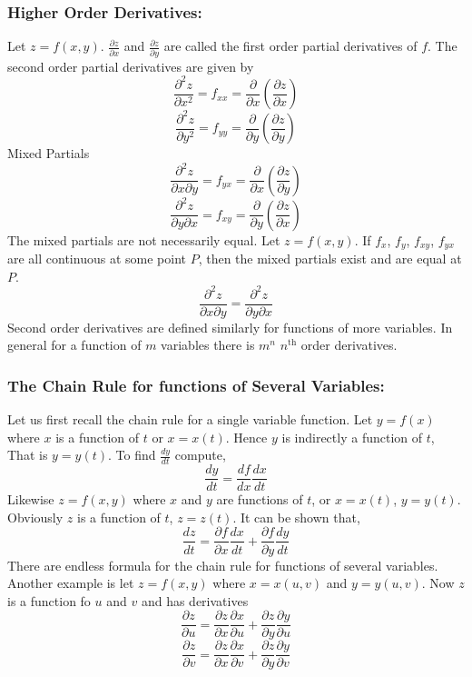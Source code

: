 \documentclass[14pt]{article}
\begin{document}
    \subsubsection{Higher Order Derivatives:}
    Let $z=f(x,y)$. $\frac{\partial z}{\partial x}$ and $\frac{\partial z}{\partial y}$ are called the first order partial derivatives of $f$. The second order partial derivatives are given by
    $$\frac{\partial^2z}{\partial x^2}=f_{xx}=\frac{\partial}{\partial x}\left(\frac{\partial z}{\partial x}\right)$$ 
    $$\frac{\partial^2z}{\partial y^2}=f_{yy}=\frac{\partial}{\partial y}\left(\frac{\partial z}{\partial y}\right)$$
    Mixed Partials
    $$\frac{\partial^2 z}{\partial x\partial y}=f_{yx}=\frac{\partial}{\partial x}\left(\frac{\partial z}{\partial y}\right)$$
    $$\frac{\partial^2 z}{\partial y\partial x}=f_{xy}=\frac{\partial}{\partial y}\left(\frac{\partial z}{\partial x}\right)$$
    The mixed partials are not necessarily equal. Let $z=f(x,y)$. If $f_x$, $f_y$, $f_{xy}$, $f_{yx}$ are all continuous at some point $P$, then the mixed partials exist and are equal at $P$.
    $$\frac{\partial^2 z}{\partial x\partial y}=\frac{\partial^2 z}{\partial y\partial x}$$
    Second order derivatives are defined similarly for functions of more variables. In general for a function of $m$ variables there is $m^n$ $n^{\mathrm{th}}$ order derivatives.
    \subsubsection{The Chain Rule for functions of Several Variables:}
    Let us first recall the chain rule for a single variable function. Let $y=f(x)$ where $x$ is a function of $t$ or $x=x(t)$. Hence $y$ is indirectly a function of $t$, That is $y=y(t)$. To find $\frac{dy}{dt}$ compute,
    $$\frac{dy}{dt}=\frac{df}{dx}\frac{dx}{dt}$$
    Likewise $z=f(x,y)$ where $x$ and $y$ are functions of $t$, or $x=x(t)$, $y=y(t)$. Obviously $z$ is a function of $t$, $z=z(t)$. It can be shown that,
    $$\frac{dz}{dt}=\frac{\partial f}{\partial x}\frac{dx}{dt}+\frac{\partial f}{\partial y}\frac{dy}{dt}$$
    There are endless formula for the chain rule for functions of several variables. Another example is let $z=f(x,y)$ where $x=x(u,v)$ and $y=y(u,v)$. Now $z$ is a function fo $u$ and $v$ and has derivatives
    $$\frac{\partial z}{\partial u}=\frac{\partial z}{\partial x}\frac{\partial x}{\partial u}+\frac{\partial z}{\partial y}\frac{\partial y}{\partial u}$$
    $$\frac{\partial z}{\partial v}=\frac{\partial z}{\partial x}\frac{\partial x}{\partial v}+\frac{\partial z}{\partial y}\frac{\partial y}{\partial v}$$
\end{document}
